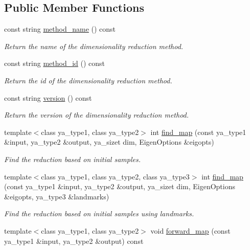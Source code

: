 \subsection*{Public Member Functions}
\begin{CompactItemize}
\item 
\hypertarget{class_y_a_iso_reduce_a2}{
const string \hyperlink{class_y_a_iso_reduce_a2}{method\_\-name} () const }
\label{class_y_a_iso_reduce_a2}

\begin{CompactList}\small\item\em Return the name of the dimensionality reduction method. \item\end{CompactList}\item 
\hypertarget{class_y_a_iso_reduce_a3}{
const string \hyperlink{class_y_a_iso_reduce_a3}{method\_\-id} () const }
\label{class_y_a_iso_reduce_a3}

\begin{CompactList}\small\item\em Return the id of the dimensionality reduction method. \item\end{CompactList}\item 
\hypertarget{class_y_a_iso_reduce_a4}{
const string \hyperlink{class_y_a_iso_reduce_a4}{version} () const }
\label{class_y_a_iso_reduce_a4}

\begin{CompactList}\small\item\em Return the version of the dimensionality reduction method. \item\end{CompactList}\item 
template$<$class ya\_\-type1, class ya\_\-type2$>$ int \hyperlink{class_y_a_iso_reduce_a5}{find\_\-map} (const ya\_\-type1 \&input, ya\_\-type2 \&output, ya\_\-sizet dim, Eigen\-Options \&eigopts)
\begin{CompactList}\small\item\em Find the reduction based on initial samples. \item\end{CompactList}\item 
template$<$class ya\_\-type1, class ya\_\-type2, class ya\_\-type3$>$ int \hyperlink{class_y_a_iso_reduce_a6}{find\_\-map} (const ya\_\-type1 \&input, ya\_\-type2 \&output, ya\_\-sizet dim, Eigen\-Options \&eigopts, ya\_\-type3 \&landmarks)
\begin{CompactList}\small\item\em Find the reduction based on initial samples using landmarks. \item\end{CompactList}\item 
\hypertarget{class_y_a_iso_reduce_a7}{
template$<$class ya\_\-type1, class ya\_\-type2$>$ void \hyperlink{class_y_a_iso_reduce_a7}{forward\_\-map} (const ya\_\-type1 \&input, ya\_\-type2 \&output) const }
\label{class_y_a_iso_reduce_a7}


\end{CompactItemize}
